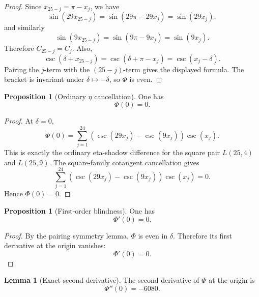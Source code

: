 \documentclass{article}
\theoremstyle{definition}
\newtheorem{lemma}[theorem]{Lemma}
\newtheorem{proposition}[theorem]{Proposition}
\numberwithin{equation}{section}
\begin{document}
\begin{proof}
Since $x_{25-j}=\pi-x_j$, we have
\begin{equation}
\sin(29x_{25-j})
=
\sin(29\pi-29x_j)
=
\sin(29x_j),
\end{equation}
and similarly
\begin{equation}
\sin(9x_{25-j})
=
\sin(9\pi-9x_j)
=
\sin(9x_j).
\end{equation}
Therefore $C_{25-j}=C_j$.  Also,
\begin{equation}
\csc(\delta+x_{25-j})
=
\csc(\delta+\pi-x_j)
=
\csc(x_j-\delta).
\end{equation}
Pairing the $j$-term with the $(25-j)$-term gives the displayed formula.  The bracket is invariant under $\delta\mapsto-\delta$, so $\Phi$ is even.
\end{proof}

\begin{proposition}[Ordinary $\eta$ cancellation]
One has
\begin{equation}
\Phi(0)=0.
\end{equation}
\end{proposition}

\begin{proof}
At $\delta=0$,
\begin{equation}
\Phi(0)
=
\sum_{j=1}^{24}
\left(
\csc(29x_j)-\csc(9x_j)
\right)
\csc(x_j).
\end{equation}
This is exactly the ordinary eta-shadow difference for the square pair $L(25,4)$ and $L(25,9)$.  The square-family cotangent cancellation gives
\begin{equation}
\sum_{j=1}^{24}
\left(
\csc(29x_j)-\csc(9x_j)
\right)
\csc(x_j)
=
0.
\end{equation}
Hence $\Phi(0)=0$.
\end{proof}

\begin{proposition}[First-order blindness]
One has
\begin{equation}
\Phi'(0)=0.
\end{equation}
\end{proposition}

\begin{proof}
By the pairing symmetry lemma, $\Phi$ is even in $\delta$.  Therefore its first derivative at the origin vanishes:
\begin{equation}
\Phi'(0)=0.
\end{equation}
\end{proof}

\begin{lemma}[Exact second derivative]
The second derivative of $\Phi$ at the origin is
\begin{equation}
\Phi''(0)
=
-6080.
\end{equation}
\end{lemma}
\end{document}
